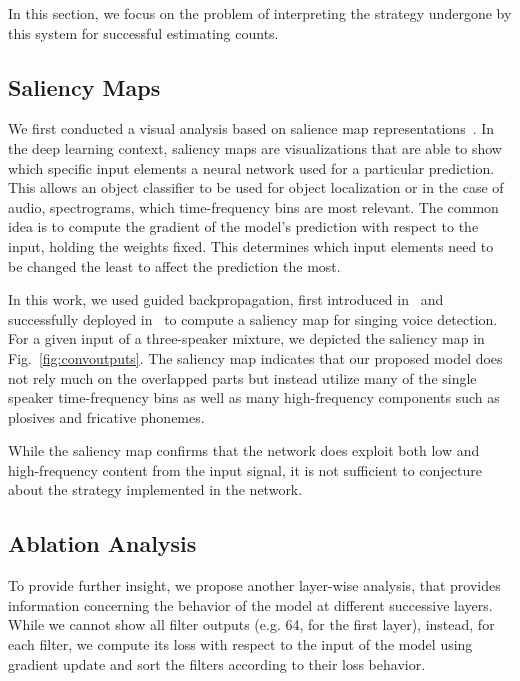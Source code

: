 In this section, we focus on the problem of interpreting the strategy undergone by this system for successful estimating counts.

\subsection{Saliency Maps}
We first conducted a visual analysis based on salience map representations~\cite{simonyan13}.
In the deep learning context, saliency maps are visualizations that are able to show which specific input elements a neural network used for a particular prediction. This allows an object classifier to be used for object localization or in the case of audio, spectrograms, which time-frequency bins are most relevant.
The common idea is to compute the gradient of the model's prediction with respect to the input, holding the weights fixed. This determines which input elements need to be changed the least to affect the prediction the most.
\par
In this work, we used guided backpropagation, first introduced in~\cite{Springenberg14} and successfully deployed in~\cite{schluter16} to compute a saliency map for singing voice detection.
For a given input of a three-speaker mixture, we depicted the saliency map in Fig.~\ref{fig:convoutputs}.
The saliency map indicates that our proposed model does not rely much on the overlapped parts but instead utilize many of the single speaker time-frequency bins as well as many high-frequency components such as plosives and fricative phonemes.\par
While the saliency map confirms that the network does exploit both low and high-frequency content from the input signal, it is not sufficient to conjecture about the strategy implemented in the network.

\subsection{Ablation Analysis}
To provide further insight, we propose another layer-wise analysis, that provides information concerning the behavior of the model at different successive layers.
While we cannot show all filter outputs (e.g. 64, for the first layer), instead, for each filter, we compute its loss with respect to the input of the model using gradient update and sort the filters according to their loss behavior.\par


